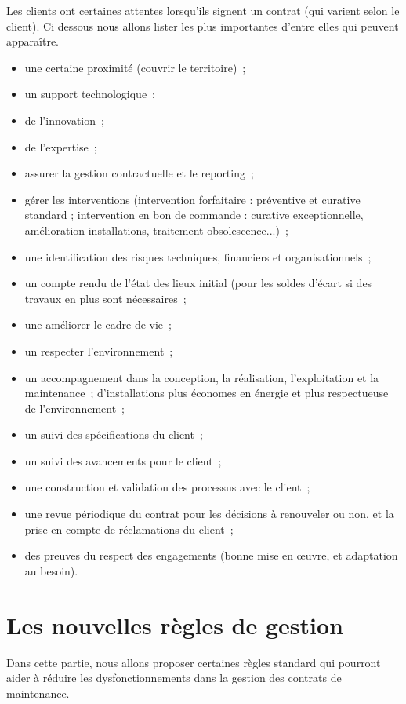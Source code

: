 	Les clients ont certaines attentes lorsqu'ils signent un contrat (qui varient selon le client). Ci dessous nous allons lister les plus importantes d'entre elles qui peuvent apparaître.

\begin{itemize}
	\item une certaine proximité (couvrir le territoire)~;
	\item un support technologique~;
	\item de l'innovation~;
	\item de l'expertise~;

	\item assurer la gestion contractuelle et le reporting~;
	\item gérer les interventions (intervention forfaitaire : préventive et curative standard ; intervention en bon de commande : curative exceptionnelle, amélioration installations, traitement obsolescence...)~;
	\item une identification des risques techniques, financiers et organisationnels~;
	\item un compte rendu de l'état des lieux initial (pour les soldes d'écart si des travaux en plus sont nécessaires~;

	\item une améliorer le cadre de vie~;
	\item un respecter l'environnement~;

	\item un accompagnement dans la conception, la réalisation, l'exploitation et la maintenance~; d'installations plus économes en énergie et plus respectueuse de l'environnement~;
	\item un suivi des spécifications du client~;
	\item un suivi des avancements pour le client~;
	\item une construction et validation des processus avec le client~;
	\item une revue périodique du contrat pour les décisions à renouveler ou non, et la prise en compte de réclamations du client~;
	\item des preuves du respect des engagements (bonne mise en œuvre, et adaptation au besoin).
\end{itemize}


\section{Les nouvelles règles de gestion}
Dans cette partie, nous allons proposer certaines règles standard qui pourront aider à réduire les dysfonctionnements dans la gestion des contrats de maintenance.


